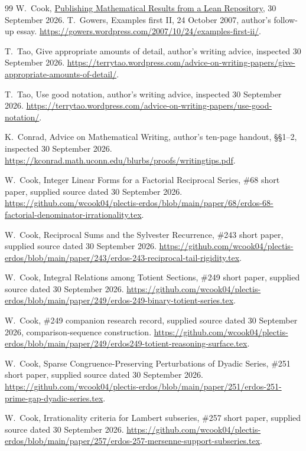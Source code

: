 \begin{thebibliography}{99}
W.~Cook, \href{https://github.com/wcook04/plectis-erdos/blob/main/paper/systems/claim-faithful-publication-systems-paper.tex}{Publishing Mathematical Results from a Lean
Repository}, 30 September 2026.
T.~Gowers, Examples first II, 24 October 2007, author's follow-up essay.
\url{https://gowers.wordpress.com/2007/10/24/examples-first-ii/}.

T.~Tao, Give appropriate amounts of detail, author's writing advice,
inspected 30 September 2026.
\url{https://terrytao.wordpress.com/advice-on-writing-papers/give-appropriate-amounts-of-detail/}.

T.~Tao, Use good notation, author's writing advice,
inspected 30 September 2026.
\url{https://terrytao.wordpress.com/advice-on-writing-papers/use-good-notation/}.

K.~Conrad, Advice on Mathematical Writing, author's ten-page handout,
\S\S1--2, inspected 30 September 2026.
\url{https://kconrad.math.uconn.edu/blurbs/proofs/writingtips.pdf}.

W.~Cook, Integer Linear Forms for a Factorial Reciprocal Series,
\#68 short paper, supplied source dated 30 September 2026.
\url{https://github.com/wcook04/plectis-erdos/blob/main/paper/68/erdos-68-factorial-denominator-irrationality.tex}.

W.~Cook, Reciprocal Sums and the Sylvester Recurrence,
\#243 short paper, supplied source dated 30 September 2026.
\url{https://github.com/wcook04/plectis-erdos/blob/main/paper/243/erdos-243-reciprocal-tail-rigidity.tex}.

W.~Cook, Integral Relations among Totient Sections,
\#249 short paper, supplied source dated 30 September 2026.
\url{https://github.com/wcook04/plectis-erdos/blob/main/paper/249/erdos-249-binary-totient-series.tex}.

W.~Cook, \#249 companion research record, supplied source dated
30 September 2026, comparison-sequence construction.
\url{https://github.com/wcook04/plectis-erdos/blob/main/paper/249/erdos249-totient-reasoning-surface.tex}.

W.~Cook, Sparse Congruence-Preserving Perturbations of Dyadic Series,
\#251 short paper, supplied source dated 30 September 2026.
\url{https://github.com/wcook04/plectis-erdos/blob/main/paper/251/erdos-251-prime-gap-dyadic-series.tex}.

W.~Cook, Irrationality criteria for Lambert subseries,
\#257 short paper, supplied source dated 30 September 2026.
\url{https://github.com/wcook04/plectis-erdos/blob/main/paper/257/erdos-257-mersenne-support-subseries.tex}.


\end{thebibliography}
